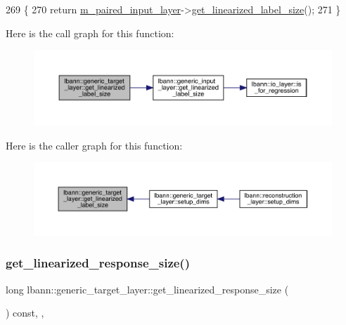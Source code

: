 \begin{DoxyCode}
269                                                   \{
270     \textcolor{keywordflow}{return} \hyperlink{classlbann_1_1generic__target__layer_a84da1260e9feb4fbc3e6f2315e4cab4b}{m\_paired\_input\_layer}->\hyperlink{classlbann_1_1generic__input__layer_ab6c24db7e2b8e73e7d7894e51246dc5e}{get\_linearized\_label\_size}();
271   \}
\end{DoxyCode}
Here is the call graph for this function\+:\nopagebreak
\begin{figure}[H]
\begin{center}
\leavevmode
\includegraphics[width=350pt]{classlbann_1_1generic__target__layer_a8a266291fb01fbcec5cac5fefdef56eb_cgraph}
\end{center}
\end{figure}
Here is the caller graph for this function\+:\nopagebreak
\begin{figure}[H]
\begin{center}
\leavevmode
\includegraphics[width=350pt]{classlbann_1_1generic__target__layer_a8a266291fb01fbcec5cac5fefdef56eb_icgraph}
\end{center}
\end{figure}
\mbox{\label{classlbann_1_1generic__target__layer_a55c3e1bcb3e4611c379b1082183b3e66}} 
\subsubsection{\texorpdfstring{get\+\_\+linearized\+\_\+response\+\_\+size()}{get\_linearized\_response\_size()}}
{\footnotesize\ttfamily long lbann\+::generic\+\_\+target\+\_\+layer\+::get\+\_\+linearized\+\_\+response\+\_\+size (\begin{DoxyParamCaption}{ }\end{DoxyParamCaption}) const\hspace{0.3cm}{\ttfamily [inline]}, {\ttfamily [override]}, {\ttfamily [virtual]}}



